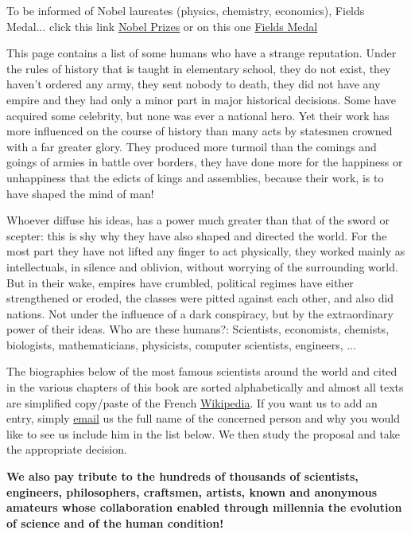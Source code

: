 To be informed of Nobel laureates (physics, chemistry, economics), Fields Medal... click this link {\href{http://www.nobelprize.org/}{{\color{blue}Nobel Prizes}}} or on this one {\href{http://www.fields.utoronto.ca/aboutus/jcfields/fields_medal.html}{{\color{blue}Fields Medal}}}

This page contains a list of some humans who have a strange reputation. Under the rules of history that is taught in elementary school, they do not exist, they haven't ordered any army, they sent nobody to death, they did not have any empire and they had only a minor part in major historical decisions. Some have acquired some celebrity, but none was ever a national hero. Yet their work has more influenced on the course of history than many acts by statesmen crowned with a far greater glory. They produced more turmoil than the comings and goings of armies in battle over borders, they have done more for the happiness or unhappiness that the edicts of kings and assemblies, because their work, is to have shaped the mind of man!

Whoever diffuse his ideas, has a power much greater than that of the sword or scepter: this is shy why they have also shaped and directed the world. For the most part they have not lifted any finger to act physically, they worked mainly as intellectuals, in silence and oblivion, without worrying of the surrounding world. But in their wake, empires have crumbled, political regimes have either strengthened or eroded, the classes were pitted against each other, and also did nations. Not under the influence of a dark conspiracy, but by the extraordinary power of their ideas. Who are these humans?: Scientists, economists, chemists, biologists, mathematicians, physicists, computer scientists, engineers, ...

The biographies below of the most famous scientists around the world and cited in the various chapters of this book are sorted alphabetically and almost all texts are simplified copy/paste of the French {\href{http://www.wikipedia.fr}{{\color{blue}Wikipedia}}}. If you want us to add an entry, simply  {\href{mailto:isoz@sciences.ch}{{\color{blue}email}}} us the full name of the concerned person and why you would like to see us include him in the list below. We then study the proposal and take the appropriate decision.

\textbf{We also pay tribute to the hundreds of thousands of scientists, engineers, philosophers, craftsmen, artists, known and anonymous amateurs whose collaboration enabled through millennia the evolution of science and of the human condition!}


